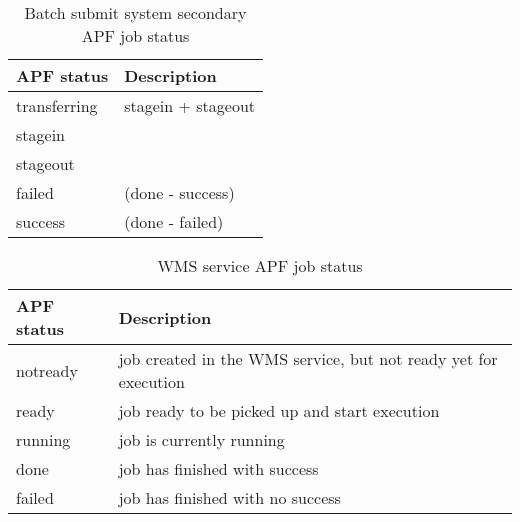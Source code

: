 \documentclass[a4paper]{jpconf}
\begin{document}
\begin{table}
   \begin{center}
      \begin{tabular}{l l}
         \hline
         \textbf{APF status} & \textbf{Description}  \\ 
         \hline
         transferring  &     stagein + stageout  \\ 
         stagein       &                         \\ 
         stageout      &                         \\ 
         failed        &     (done - success)    \\ 
         success       &     (done - failed)     \\ 
         \hline
      \end{tabular}
   \end{center}
   \caption{Batch submit system secondary APF job status} 
   \label{job secondary status}
\end{table}



\begin{table}
   \begin{center}
      \begin{tabular}{l l}
         \hline
         \textbf{APF status} & \textbf{Description} \\
         \hline
         notready &     job created in the WMS service, but not ready yet for execution\\ 
         ready    &     job ready to be picked up and start execution                  \\ 
         running  &     job is currently running                                       \\ 
         done     &     job has finished with success                                  \\ 
         failed   &     job has finished with no success                               \\ 
         \hline
      \end{tabular}
   \end{center}
   \caption{WMS service APF job status}
   \label{wms job status}
\end{table}
\end{document}
